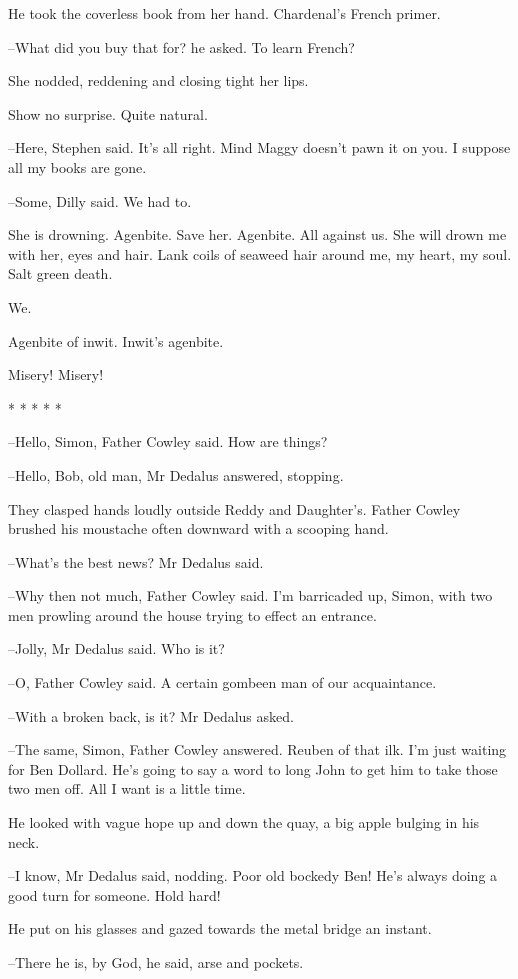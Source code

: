 He took the coverless book from her hand. Chardenal's French primer.

--What did you buy that for? he asked. To learn French?

She nodded, reddening and closing tight her lips.

Show no surprise. Quite natural.

--Here, Stephen said. It's all right. Mind Maggy doesn't pawn it on you.
I suppose all my books are gone.

--Some, Dilly said. We had to.

She is drowning. Agenbite. Save her. Agenbite. All against us. She will
drown me with her, eyes and hair. Lank coils of seaweed hair around me,
my heart, my soul. Salt green death.

We.

Agenbite of inwit. Inwit's agenbite.

Misery! Misery!


    * * * * *


--Hello, Simon, Father Cowley said. How are things?

--Hello, Bob, old man, Mr Dedalus answered, stopping.

They clasped hands loudly outside Reddy and Daughter's. Father Cowley
brushed his moustache often downward with a scooping hand.

--What's the best news? Mr Dedalus said.

--Why then not much, Father Cowley said. I'm barricaded up, Simon, with
two men prowling around the house trying to effect an entrance.

--Jolly, Mr Dedalus said. Who is it?

--O, Father Cowley said. A certain gombeen man of our acquaintance.

--With a broken back, is it? Mr Dedalus asked.

--The same, Simon, Father Cowley answered. Reuben of that ilk. I'm just
waiting for Ben Dollard. He's going to say a word to long John to get him
to take those two men off. All I want is a little time.

He looked with vague hope up and down the quay, a big apple bulging in
his neck.

--I know, Mr Dedalus said, nodding. Poor old bockedy Ben! He's always
doing a good turn for someone. Hold hard!

He put on his glasses and gazed towards the metal bridge an instant.

--There he is, by God, he said, arse and pockets.

